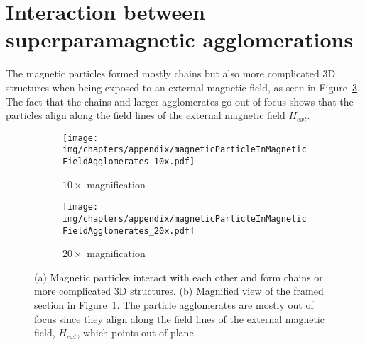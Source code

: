 \section{Interaction between superparamagnetic agglomerations}
The magnetic particles formed mostly chains but also more complicated 3D structures when being exposed to an external magnetic field, as seen in Figure~\ref{fig:interactionBetweenSuperparamagneticAgglomerates}. The fact that the chains and larger agglomerates go out of focus shows that the particles align along the field lines of the external magnetic field $H_{ext}$.
\begin{figure}[htb]
	\centering
	\begin{subfigure}[b]{0.48\textwidth}
		\texttt{[image: img/chapters/appendix/magneticParticleInMagneticFieldAgglomerates\_10x.pdf]}
		\caption{$10\times$ magnification}
		\label{fig:interactionBetweenSuperparamagneticAgglomerates10x}
	\end{subfigure}
	\hfill
	\begin{subfigure}[b]{0.48\textwidth}
		\texttt{[image: img/chapters/appendix/magneticParticleInMagneticFieldAgglomerates\_20x.pdf]}
		\caption{$20\times$ magnification}
		\label{fig:interactionBetweenSuperparamagneticAgglomerates20x}
	\end{subfigure}
	\label{fig:interactionBetweenSuperparamagneticAgglomerates}
	\caption[Interaction between magnetic particle and particle agglomerates]{(a) Magnetic particles interact with each other and form chains or more complicated 3D structures. (b) Magnified view of the framed section in Figure~\ref{fig:interactionBetweenSuperparamagneticAgglomerates10x}. The particle agglomerates are mostly out of focus since they align along the field lines of the external magnetic field, $H_{ext}$, which points out of plane.}
\end{figure}
